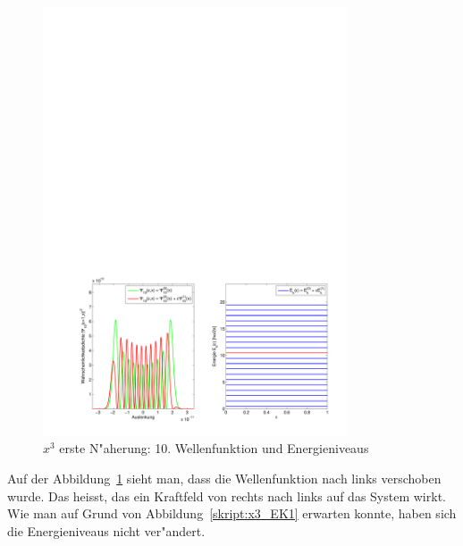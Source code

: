 \begin{refsection}
\begin{figure}	%
\centering
\includegraphics[width=0.8\textwidth]{anharmonisch/images/x3/Stoerung1Wellenfunktion.pdf}
\caption{$x^3$ erste N"aherung: 10. Wellenfunktion und Energieniveaus 
\label{skript:x3_Stoerung1Wellenfunktion}}
\end{figure}

Auf der Abbildung~\ref{skript:x3_Stoerung1Wellenfunktion} sieht man,
dass die Wellenfunktion nach links verschoben wurde.
Das heisst, das ein Kraftfeld von rechts nach links auf das System wirkt.
Wie man auf Grund von Abbildung~\ref{skript:x3_EK1} erwarten konnte,
haben sich die Energieniveaus nicht ver"andert.


\end{refsection}
